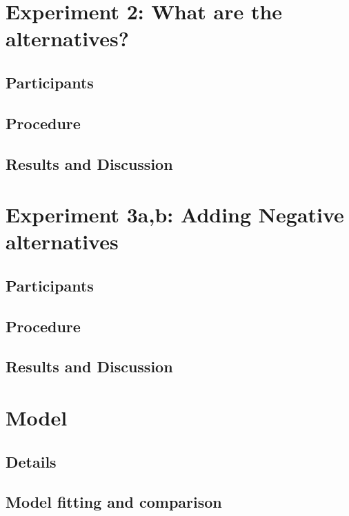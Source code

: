 \documentclass[10pt, letterpaper]{article}
\begin{document}
\section{Experiment 2: What are the
alternatives?}\label{experiment-2-what-are-the-alternatives}

\subsection{Participants}\label{participants-1}

\subsection{Procedure}\label{procedure-1}

\subsection{Results and Discussion}\label{results-and-discussion-1}

\section{Experiment 3a,b: Adding Negative
alternatives}\label{experiment-3ab-adding-negative-alternatives}

\subsection{Participants}\label{participants-2}

\subsection{Procedure}\label{procedure-2}

\subsection{Results and Discussion}\label{results-and-discussion-2}

\section{Model}\label{model}

\subsection{Details}\label{details}

\subsection{Model fitting and
comparison}\label{model-fitting-and-comparison}
\end{document}
